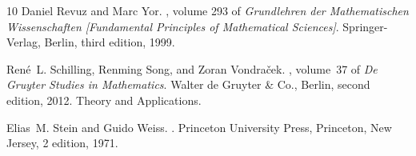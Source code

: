 \documentclass[12pt,reqno,a4paper]{amsart}
\theoremstyle{definition}
\theoremstyle{remark}
\numberwithin{equation}{section}
\newcommand{\1}{\mathbbm{1}}
\begin{document}
\begin{thebibliography}{10}
Daniel Revuz and Marc Yor.
, volume 293 of
  {\em Grundlehren der Mathematischen Wissenschaften [Fundamental Principles of
  Mathematical Sciences]}.
\newblock Springer-Verlag, Berlin, third edition, 1999.

Ren\'{e}~L. Schilling, Renming Song, and Zoran Vondra\v{c}ek.
, volume~37 of {\em De Gruyter Studies in
  Mathematics}.
\newblock Walter de Gruyter \& Co., Berlin, second edition, 2012.
\newblock Theory and Applications.

Elias~M. Stein and Guido Weiss.
.
\newblock Princeton University Press, Princeton, New Jersey, 2 edition, 1971.

\end{thebibliography}
\end{document}
